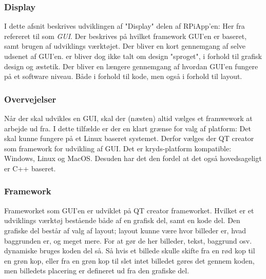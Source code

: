 \documentclass[Softwaredesign/Softwaredesign_main.tex]{subfiles}
\begin{document}
\subsubsection{Display}
I dette afsnit beskrives udviklingen af "Display" delen af RPiApp'en: Her fra refereret til som \textit{GUI}. Der beskrives på hvilket framework GUI'en er baseret, samt brugen af udviklings værktøjet. Der bliver en kort gennemgang af selve udsenet af GUI'en.  er bliver dog ikke talt om design "sproget", i forhold til grafisk design og æstetik. Der bliver en længere gennemgang af hvordan GUI'en fungere på et software niveau. Både i forhold til kode, men også i forhold til layout.

\subsubsection{Overvejelser}
Når der skal udvikles en GUI, skal der (næsten) altid vælges et framwework at arbejde ud fra. I dette tilfælde er der en klart grænse for valg af platform: Det skal kunne fungere på et Linux baseret systemet. Derfor vælges der QT creator som framework for udvikling af GUI. Det er kryds-platform kompatible: Windows, Linux og MacOS. Desuden har det den fordel at det også hovedsageligt er C++ baseret. 


\subsubsection{Framework}
Frameworket som GUI'en er udviklet på QT creator frameworket. Hvilket er et udviklings værktøj bestående både af en grafisk del, samt en kode del. Den grafiske del består af valg af layout; layout kunne være hvor billeder er, hvad baggrunden er, og meget mere. For at gør de her billeder, tekst, baggrund osv. dynamiske bruges koden del så. Så hvis et billede skulle skifte fra en rød kop til en grøn kop, eller fra en grøn kop til slet intet billedet gøres det gennem koden, men billedets placering er defineret ud fra den grafiske del. 
\end{document}
